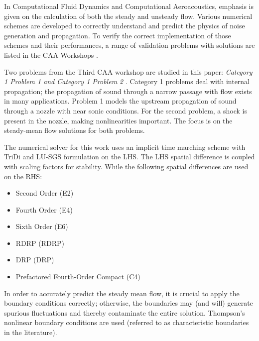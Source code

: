 \documentclass[conf]{new-aiaa}
\begin{document}
In Computational Fluid Dynamics and Computational Aeroacoustics, emphasis is given on the calculation of both the steady and unsteady flow. 
Various numerical schemes are developed to correctly understand and predict the physics of noise generation and propagation. 
To verify the correct implementation of those schemes and their performances, a range of validation problems with solutions are listed in the CAA Workshops \cite{CAA1, CAA2, CAA3}.

Two problems from the Third CAA workshop are studied in this paper: \textit{Category 1 Problem 1 and Category 1 Problem 2} \cite{CAA3}. 
Category 1 problems deal with internal propagation; 
the propagation of sound through a narrow passage with flow exists in many applications. 
Problem 1 models the upstream propagation of sound through a nozzle with near sonic conditions. 
For the second problem, a shock is present in the nozzle, making nonlinearities important. 
The focus is on the steady-mean flow solutions for both problems.  

The numerical solver for this work uses an implicit time marching scheme with TriDi and LU-SGS formulation on the LHS. 
The LHS spatial difference is coupled with scaling factors for stability. 
While the following spatial differences are used on the RHS:
\begin{itemize}
	\item Second Order (E2)
	\item Fourth Order (E4)
	\item Sixth Order (E6)
	\item RDRP  (RDRP)
	\item DRP  (DRP)
	\item Prefactored Fourth-Order Compact (C4)
\end{itemize}

In order to accurately predict the steady mean flow, it is crucial to apply the boundary conditions correctly; otherwise, the boundaries may (and will) generate spurious fluctuations and thereby contaminate the entire solution. 
Thompson's nonlinear boundary conditions are used (referred to as characteristic boundaries in the literature).  
\end{document}
